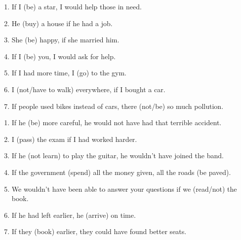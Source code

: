\begin{enumerate}
      \item If I \underline{\hspace{2cm}} (be) a star, I would help those in need.
      \item He \underline{\hspace{2cm}} (buy) a house if he had a job.
      \item She \underline{\hspace{2cm}} (be) happy, if she married him.
      \item If I \underline{\hspace{2cm}} (be) you, I would ask for help.
      \item If I had more time, I \underline{\hspace{2cm}} (go) to the gym.
      \item I \underline{\hspace{2cm}} (not/have to walk) everywhere, if I bought a car.
      \item If people used bikes instead of cars, there \underline{\hspace{2cm}} (not/be) so much pollution.
\end{enumerate}

\begin{enumerate}
      \item If he \underline{\hspace{2cm}} (be) more careful, he would not have had that terrible accident.
      \item I \underline{\hspace{2cm}} (pass) the exam if I had worked harder.
      \item If he \underline{\hspace{2cm}} (not learn) to play the guitar, he wouldn’t have joined the band.
      \item If the government \underline{\hspace{2cm}} (spend) all the money given, all the roads \underline{\hspace{2cm}} (be paved).
      \item We wouldn't have been able to answer your questions if we \underline{\hspace{2cm}} (read/not) the book.
      \item If he had left earlier, he \underline{\hspace{2cm}} (arrive) on time.
      \item If they \underline{\hspace{2cm}} (book) earlier, they could have found better seats.
\end{enumerate}

